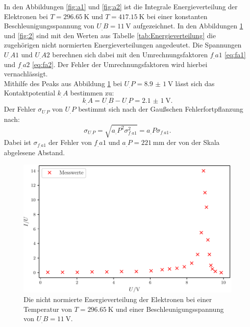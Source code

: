 In den Abbildungen \ref{fig:a1} und \ref{fig:a2} ist die Integrale Energieverteilung der Elektronen bei $T = \SI{296,65}{\kelvin}$ und $T = \SI{417,15}{\kelvin}$ bei einer konstanten Beschleunigungsspannung von $U_.B = \SI{11}{\volt}$ aufgezeichnet.
In den Abbildungen \ref{fig:1} und \ref{fig:2} sind mit den Werten aus Tabelle \ref{tab:Energieverteilung} die zugehörigen nicht normierten Energieverteilungen angedeutet. Die Spannungen $U_.{A1}$ und $U_.{A2}$ berechnen sich dabei mit den Umrechnungsfaktoren $f_.{a1}$ \eqref{eq:fa1} und $f_.{a2}$ \eqref{eq:fa2}. Der Fehler der Umrechnungsfaktoren wird hierbei vernachlässigt.\\  
Mithilfe des Peaks aus Abbildung \ref{fig:1} bei $U_.P = \SI{8,9(1)}{\volt}$ lässt sich das Kontaktpotential $k_.A$ bestimmen zu:
\[
k_.A = U_.B-U_.P = \SI{2,1(1)}{\volt}\text{.}
\]
Der Fehler $\sigma_{U_.P}$ von $U_.P$ bestimmt sich nach der Gaußschen Fehlerfortpflanzung nach:
\[
\sigma_{U_.P} = \sqrt{a_.P^2\sigma_{f_.{a1}}^2} = a_.P\sigma_{f_.{a1}}\text{.}
\]
Dabei ist $\sigma_{f_.{a1}}$ der Fehler von $f_.{a1}$ und $a_.P = \SI{221}{\milli\metre}$ der von der Skala abgelesene Abstand.        

\begin{figure}
\centering
\includegraphics[width=\linewidth-70pt,height=\textheight-70pt,keepaspectratio]{content/images/fig1.pdf}
\caption{Die nicht normierte Energieverteilung der Elektronen bei einer Temperatur von $T=\SI{296,65}{\kelvin}$ und einer Beschleunigungsspannung von $U_.B=\SI{11}{\volt}$.}
\label{fig:1}
\end{figure}

